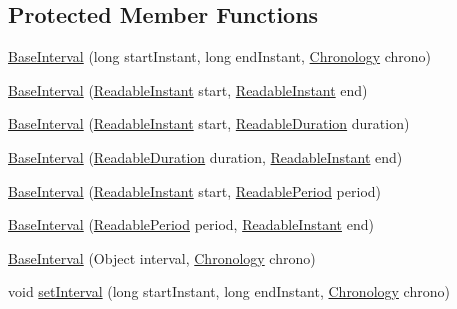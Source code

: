 \subsection*{Protected Member Functions}
\begin{DoxyCompactItemize}
\item 
\hyperlink{classorg_1_1joda_1_1time_1_1base_1_1_base_interval_a4044a4277509d77ad0794268d9d293e2}{Base\-Interval} (long start\-Instant, long end\-Instant, \hyperlink{classorg_1_1joda_1_1time_1_1_chronology}{Chronology} chrono)
\item 
\hyperlink{classorg_1_1joda_1_1time_1_1base_1_1_base_interval_aed08c72720903b8f90b37dcaac6652a4}{Base\-Interval} (\hyperlink{interfaceorg_1_1joda_1_1time_1_1_readable_instant}{Readable\-Instant} start, \hyperlink{interfaceorg_1_1joda_1_1time_1_1_readable_instant}{Readable\-Instant} end)
\item 
\hyperlink{classorg_1_1joda_1_1time_1_1base_1_1_base_interval_a4579e3193fc62b5087fbf5a05e68966c}{Base\-Interval} (\hyperlink{interfaceorg_1_1joda_1_1time_1_1_readable_instant}{Readable\-Instant} start, \hyperlink{interfaceorg_1_1joda_1_1time_1_1_readable_duration}{Readable\-Duration} duration)
\item 
\hyperlink{classorg_1_1joda_1_1time_1_1base_1_1_base_interval_a1fc0cc4e403a65ada0774907d4f81793}{Base\-Interval} (\hyperlink{interfaceorg_1_1joda_1_1time_1_1_readable_duration}{Readable\-Duration} duration, \hyperlink{interfaceorg_1_1joda_1_1time_1_1_readable_instant}{Readable\-Instant} end)
\item 
\hyperlink{classorg_1_1joda_1_1time_1_1base_1_1_base_interval_a33161c661d5937a42c79743464bd57b5}{Base\-Interval} (\hyperlink{interfaceorg_1_1joda_1_1time_1_1_readable_instant}{Readable\-Instant} start, \hyperlink{interfaceorg_1_1joda_1_1time_1_1_readable_period}{Readable\-Period} period)
\item 
\hyperlink{classorg_1_1joda_1_1time_1_1base_1_1_base_interval_a47edbc9d67fe9915b07e338f919c38c3}{Base\-Interval} (\hyperlink{interfaceorg_1_1joda_1_1time_1_1_readable_period}{Readable\-Period} period, \hyperlink{interfaceorg_1_1joda_1_1time_1_1_readable_instant}{Readable\-Instant} end)
\item 
\hyperlink{classorg_1_1joda_1_1time_1_1base_1_1_base_interval_a2ae562680281bccb122395347a38121b}{Base\-Interval} (Object interval, \hyperlink{classorg_1_1joda_1_1time_1_1_chronology}{Chronology} chrono)
\item 
void \hyperlink{classorg_1_1joda_1_1time_1_1base_1_1_base_interval_ae5ac10bd0f2d8c455715e92e8f7b6dea}{set\-Interval} (long start\-Instant, long end\-Instant, \hyperlink{classorg_1_1joda_1_1time_1_1_chronology}{Chronology} chrono)
\end{DoxyCompactItemize}


